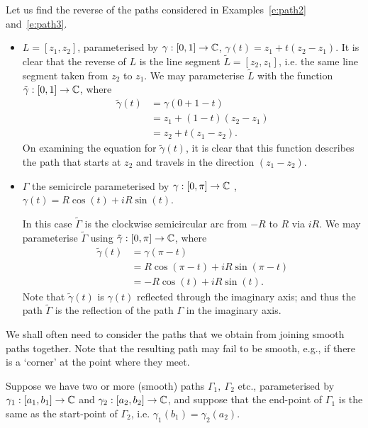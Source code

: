 \begin{example}
Let us find the reverse of the paths considered in Examples~\ref{e:path2} and~\ref{e:path3}.

\begin{itemize}
\item $L=[z_1, z_2 ] $, parameterised by $\gamma:[0,1] \to \mathbb{C}$, $\gamma (t) = z_1 + t ( z_2 - z_1 )$.
It is clear that the reverse of $L$ is the line segment $\tilde{L}=[z_2,z_1]$, i.e. the same line segment taken from $z_2$ to $z_1$.  We may parameterise $\tilde{L}$ with the function $\tilde{\gamma}:[0,1] \to \mathbb{C}$, where
\begin{align*}
\tilde{\gamma} (t) & = \gamma (0+1-t ) \\
& = z_1 + (1-t)(z_2-z_1) \\
& = z_2+t(z_1-z_2).
\end{align*}
On examining the equation for $\tilde{\gamma} (t)$, it is clear that this function describes the path that starts at $z_2$ and travels in the direction $(z_1-z_2)$.
\item  $\Gamma$ the semicircle parameterised by $\gamma:[0,\pi] \to \mathbb{C}$ , $\gamma (t) = R \cos (t) + i R \sin (t)$. 

In this case $\tilde{\Gamma}$ is the clockwise semicircular arc from $-R$ to $R$ via $iR$.  We may parameterise $\tilde{\Gamma}$ using $\tilde{\gamma}:[0,\pi] \to \mathbb{C}$, where
\begin{align*}
\tilde{\gamma} (t) & = \gamma ( \pi-t) \\
& = R \cos ( \pi-t)+iR \sin (\pi-t) \\
& = -R \cos (t) + i R \sin (t).
\end{align*}
Note that $\tilde{\gamma} (t)$ is $\gamma (t)$ reflected through the imaginary axis; and thus the path $\tilde{\Gamma}$ is the reflection of the path $\Gamma$ in the imaginary axis.

\end{itemize}
\end{example}

We shall often need to consider the paths that we obtain from joining smooth paths together.  Note that the resulting path may fail to be smooth, e.g., if there is a `corner' at the point where they meet.

Suppose we have two or more (smooth) paths $\Gamma_1,\ \Gamma_2$ etc., parameterised by $\gamma_1:[a_1,b_1] \to \mathbb{C}$ and $\gamma_2:[a_2,b_2] \to \mathbb{C}$, and suppose that the end-point of $\Gamma_1$ is the same as the start-point of $\Gamma_2$, i.e. $\gamma_1(b_1)=\gamma_2(a_2)$.


